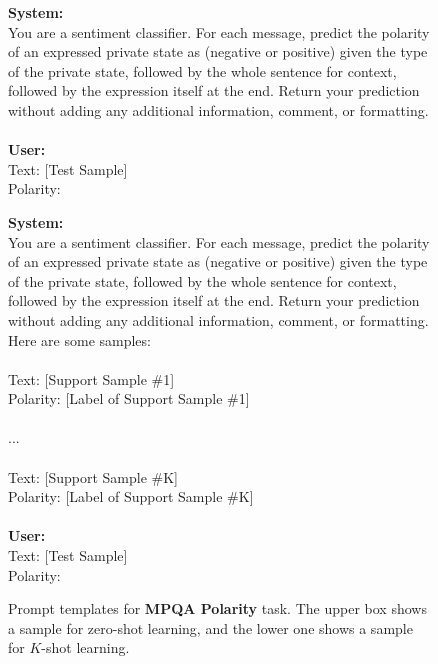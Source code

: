 \documentclass[11pt]{article}
\theoremstyle{definition}
\begin{document}
\begin{figure*} [htb]
    \centering
    \begin{mdframed}
    \small
    \textbf{System:} \\
    You are a sentiment classifier. For each message, predict the polarity of an expressed private state as (negative or positive) given the type of the private state, followed by the whole sentence for context, followed by the expression itself at the end. Return your prediction without adding any additional information, comment, or formatting. \\
    \\
    \textbf{User:} \\
    Text: [Test Sample] \\
    Polarity: 
    
    \end{mdframed}
    \begin{mdframed}
    \small
    \textbf{System:} \\
    You are a sentiment classifier. For each message, predict the polarity of an expressed private state as (negative or positive) given the type of the private state, followed by the whole sentence for context, followed by the expression itself at the end. Return your prediction without adding any additional information, comment, or formatting. Here are some samples: \\
    \\
    Text: [Support Sample \#1] \\
    Polarity: [Label of Support Sample \#1] \\
    \\
    ... \\
    \\
    Text: [Support Sample \#K] \\
    Polarity: [Label of Support Sample \#K] \\
    \\
    \textbf{User:} \\
    Text: [Test Sample] \\
    Polarity:     
    \end{mdframed}
	\caption{Prompt templates for {\bf MPQA Polarity} task. The upper box shows a sample for zero-shot learning, and the lower one shows a sample for $K$-shot learning.}
	\label{fig:icl-template-p}
\end{figure*}
\end{document}
